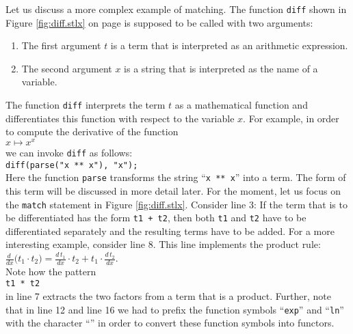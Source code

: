 \noindent
Let us discuss a more complex example of matching.  The function \texttt{diff} shown in Figure
\ref{fig:diff.stlx} on page \pageref{fig:diff.stlx} is supposed to be called with two arguments:
\begin{enumerate}
\item The first argument $t$ is a term that is interpreted as an arithmetic expression.
\item The second argument $x$ is a string that is interpreted as  the name of a variable.
\end{enumerate}
The function \texttt{diff} interprets the term $t$ as a mathematical function and differentiates this
function with respect to the variable $x$.  For example, in order to compute the derivative of the function
\\[0.2cm]
\hspace*{1.3cm}
$x \mapsto x^x$
\\[0.2cm]
we can invoke \texttt{diff} as follows:
\\[0.2cm]
\hspace*{1.3cm}
\texttt{diff(parse("x ** x"), "x");}
\\[0.2cm]
Here the function \texttt{parse} transforms the string ``\texttt{x ** x}'' into a term.  The form of
this term will be discussed in more detail later.  For the moment, let us focus on the
\texttt{match} statement in Figure
\ref{fig:diff.stlx}.  Consider line 3: If the term that is to be differentiated has the form
\texttt{t1 + t2}, then both \texttt{t1} and \texttt{t2} have to be differentiated separately and the
resulting terms have to be added.  For a more interesting example, consider line 8.  This line
implements the product rule:
\\[0.2cm]
\hspace*{1.3cm}
$\frac{d\;}{dx} \bigl(t_1 \cdot t_2\bigr) = \frac{d\, t_1}{dx} \cdot t_2 + t_1 \cdot \frac{d\,t_2}{dx}$.
\\[0.2cm]
Note how the pattern 
\\[0.2cm]
\hspace*{1.3cm}
\texttt{t1 * t2}
\\[0.2cm]
in line 7 extracts the two factors from a term that is a product.  Further, note that in line 12 and line 16
we had to prefix the function symbols ``\texttt{exp}'' and ``\texttt{ln}'' with the character
``\texttt{}'' in order to convert these function symbols into functors.

